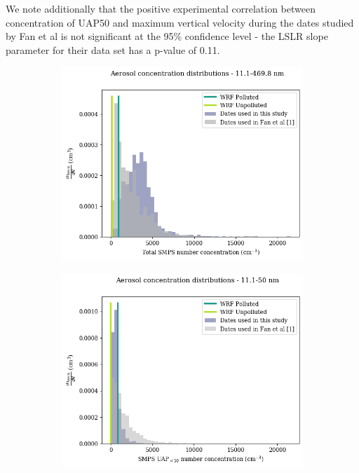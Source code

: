 \documentclass{article}
\begin{document}
We note additionally that the positive experimental correlation between concentration of UAP50 and maximum vertical velocity during the dates studied by Fan et al is not significant at the 95\% confidence level - the LSLR slope parameter for their data set has a p-value of 0.11.
\begin{figure}[ht]
	\centering
	\begin{subfigure}{0.7\textwidth}
		\includegraphics[width=\textwidth]{goamazon/tot_compare_nconc_hist_figure.png}
		\label{goamazontothist}
		\caption{}
	\end{subfigure}
	\begin{subfigure}{0.7\textwidth}
		\includegraphics[width=\textwidth]{goamazon/uap50_compare_nconc_hist_figure.png}

\end{subfigure}
\end{figure}
\end{document}

